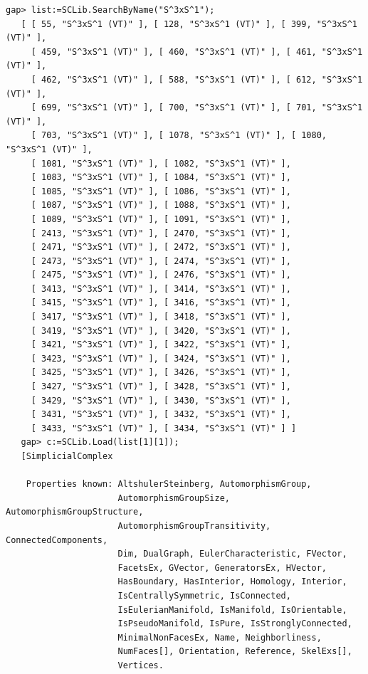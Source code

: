 \documentclass[a4paper,11pt]{report}
\begin{document}
{{{\begin{Verbatim}[commandchars=!@|,fontsize=\small,frame=single,label=Example]
\end{Verbatim}
 
\begin{Verbatim}[commandchars=!@|,fontsize=\small,frame=single,label=Example]
   gap> list:=SCLib.SearchByName("S^3xS^1");
   [ [ 55, "S^3xS^1 (VT)" ], [ 128, "S^3xS^1 (VT)" ], [ 399, "S^3xS^1 (VT)" ], 
     [ 459, "S^3xS^1 (VT)" ], [ 460, "S^3xS^1 (VT)" ], [ 461, "S^3xS^1 (VT)" ], 
     [ 462, "S^3xS^1 (VT)" ], [ 588, "S^3xS^1 (VT)" ], [ 612, "S^3xS^1 (VT)" ], 
     [ 699, "S^3xS^1 (VT)" ], [ 700, "S^3xS^1 (VT)" ], [ 701, "S^3xS^1 (VT)" ], 
     [ 703, "S^3xS^1 (VT)" ], [ 1078, "S^3xS^1 (VT)" ], [ 1080, "S^3xS^1 (VT)" ],
     [ 1081, "S^3xS^1 (VT)" ], [ 1082, "S^3xS^1 (VT)" ], 
     [ 1083, "S^3xS^1 (VT)" ], [ 1084, "S^3xS^1 (VT)" ], 
     [ 1085, "S^3xS^1 (VT)" ], [ 1086, "S^3xS^1 (VT)" ], 
     [ 1087, "S^3xS^1 (VT)" ], [ 1088, "S^3xS^1 (VT)" ], 
     [ 1089, "S^3xS^1 (VT)" ], [ 1091, "S^3xS^1 (VT)" ], 
     [ 2413, "S^3xS^1 (VT)" ], [ 2470, "S^3xS^1 (VT)" ], 
     [ 2471, "S^3xS^1 (VT)" ], [ 2472, "S^3xS^1 (VT)" ], 
     [ 2473, "S^3xS^1 (VT)" ], [ 2474, "S^3xS^1 (VT)" ], 
     [ 2475, "S^3xS^1 (VT)" ], [ 2476, "S^3xS^1 (VT)" ], 
     [ 3413, "S^3xS^1 (VT)" ], [ 3414, "S^3xS^1 (VT)" ], 
     [ 3415, "S^3xS^1 (VT)" ], [ 3416, "S^3xS^1 (VT)" ], 
     [ 3417, "S^3xS^1 (VT)" ], [ 3418, "S^3xS^1 (VT)" ], 
     [ 3419, "S^3xS^1 (VT)" ], [ 3420, "S^3xS^1 (VT)" ], 
     [ 3421, "S^3xS^1 (VT)" ], [ 3422, "S^3xS^1 (VT)" ], 
     [ 3423, "S^3xS^1 (VT)" ], [ 3424, "S^3xS^1 (VT)" ], 
     [ 3425, "S^3xS^1 (VT)" ], [ 3426, "S^3xS^1 (VT)" ], 
     [ 3427, "S^3xS^1 (VT)" ], [ 3428, "S^3xS^1 (VT)" ], 
     [ 3429, "S^3xS^1 (VT)" ], [ 3430, "S^3xS^1 (VT)" ], 
     [ 3431, "S^3xS^1 (VT)" ], [ 3432, "S^3xS^1 (VT)" ], 
     [ 3433, "S^3xS^1 (VT)" ], [ 3434, "S^3xS^1 (VT)" ] ]
   gap> c:=SCLib.Load(list[1][1]);           
   [SimplicialComplex
   
    Properties known: AltshulerSteinberg, AutomorphismGroup, 
                      AutomorphismGroupSize, AutomorphismGroupStructure, 
                      AutomorphismGroupTransitivity, ConnectedComponents, 
                      Dim, DualGraph, EulerCharacteristic, FVector, 
                      FacetsEx, GVector, GeneratorsEx, HVector, 
                      HasBoundary, HasInterior, Homology, Interior, 
                      IsCentrallySymmetric, IsConnected, 
                      IsEulerianManifold, IsManifold, IsOrientable, 
                      IsPseudoManifold, IsPure, IsStronglyConnected, 
                      MinimalNonFacesEx, Name, Neighborliness, 
                      NumFaces[], Orientation, Reference, SkelExs[], 
                      Vertices.
   

\end{Verbatim}}}}
\end{document}
